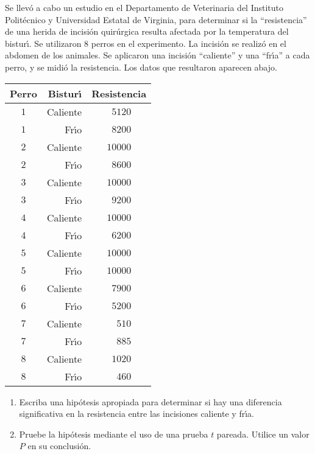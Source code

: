 \begin{enunciado}
 Se llev\'o a cabo un estudio en el Departamento de Veterinaria del Instituto Polit\'ecnico y Universidad Estatal de Virginia, para determinar si la ``resistencia'' de una herida de incisi\'on quir\'urgica resulta afectada por la temperatura del bistur\'{\i}. Se utilizaron $8$ perros en el experimento. La incisi\'on se realiz\'o en el abdomen de los animales. Se aplicaron una incisi\'on ``caliente'' y una ``fr\'{\i}a'' a cada perro, y se midi\'o la resistencia. Los datos que resultaron aparecen abajo.
 \begin{center}
  \begin{tabular}{crc}
   \textbf{Perro} & \textbf{Bistur\'{\i}} & \textbf{Resistencia} \\
   \hline 
   $1$ & Caliente & $\phantom{1}5120$ \\
   $1$ & Fr\'{\i}o & $\phantom{1}8200$ \\
   $2$ & Caliente & $10000$ \\
   $2$ & Fr\'{\i}o & $\phantom{1}8600$ \\
   $3$ & Caliente & $10000$ \\
   $3$ & Fr\'{\i}o & $\phantom{1}9200$ \\
   $4$ & Caliente & $10000$ \\
   $4$ & Fr\'{\i}o & $\phantom{1}6200$ \\
   $5$ & Caliente & $10000$ \\
   $5$ & Fr\'{\i}o & $10000$ \\
   $6$ & Caliente & $\phantom{1}7900$ \\
   $6$ & Fr\'{\i}o & $\phantom{1}5200$ \\
   $7$ & Caliente & $\phantom{19}510$ \\
   $7$ & Fr\'{\i}o & $\phantom{19}885$ \\
   $8$ & Caliente & $\phantom{1}1020$ \\
   $8$ & Fr\'{\i}o & $\phantom{19}460$
  \end{tabular}
 \end{center}
 \begin{enumerate}
  \item Escriba una hip\'otesis apropiada para determinar si hay una diferencia significativa en la resistencia entre las incisiones caliente y fr\'{\i}a.
  \item Pruebe la hip\'otesis mediante el uso de una prueba $t$ pareada. Utilice un valor $P$ en su conclusi\'on.
 \end{enumerate}
\end{enunciado}

